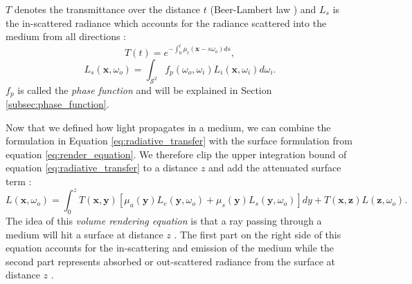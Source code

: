 $T$ denotes the transmittance over the distance $t$ (Beer-Lambert law \cite{lambert}) and $L_s$ is the in-scattered radiance which accounts for the radiance scattered into the medium from all directions \cite{novak_overview}:
\begin{equation}
    \label{eq:beer_lambert_law}
    T(t) = e^{-\int_0^t \mu_t(\boldsymbol{x} - s\omega_o)ds},
\end{equation}
\begin{equation}
    \label{eq:in_scattered_radiance}
    L_s(\boldsymbol{x}, \omega_o) = \int_{\mathcal{S}^2} f_p(\omega_o, \omega_i)L_i(\boldsymbol{x}, \omega_i)d\omega_i.
\end{equation}
$f_p$ is called the \textit{phase function} and will be explained in Section \ref{subsec:phase_function}.

Now that we defined how light propagates in a medium, we can combine the formulation in Equation \ref{eq:radiative_transfer} with the surface formulation from equation \ref{eq:render_equation}.
We therefore clip the upper integration bound of equation \ref{eq:radiative_transfer} to a distance $z$ and add the attenuated surface term \cite{novak_overview}:
\begin{equation*}
    L(\boldsymbol{x}, \omega_o) = \int_0^z T(\boldsymbol{x}, \boldsymbol{y})[\mu_a(\boldsymbol{y})L_e(\boldsymbol{y}, \omega_o) + \mu_s(\boldsymbol{y})L_s(\boldsymbol{y}, \omega_o)]dy + T(\boldsymbol{x}, \boldsymbol{z})L(\boldsymbol{z}, \omega_o).
\end{equation*}
The idea of this \textit{volume rendering equation} is that a ray passing through a medium will hit a surface at distance $z$ \cite{novak_overview}.
The first part on the right side of this equation accounts for the in-scattering and emission of the medium while the second part represents absorbed or out-scattered radiance from the surface at distance $z$ \cite{novak_overview}.

